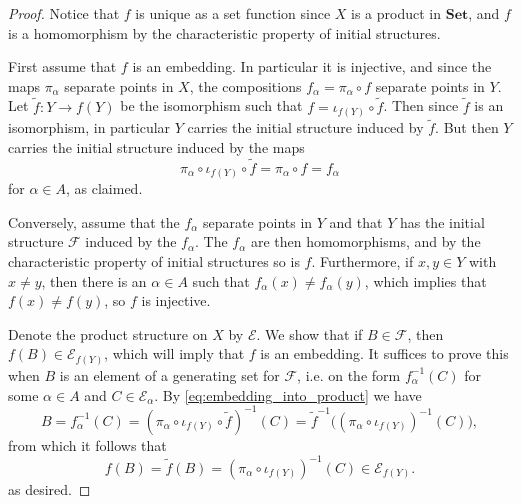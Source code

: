 \documentclass[article, a4paper, 11pt, oneside]{memoir}
\numberwithin{equation}{chapter}
\newcommand{\calE}{\mathcal{E}}
\newcommand{\calF}{\mathcal{F}}
\newcommand{\ncat}[1]{\mathbf{#1}} %
\newcommand{\catSet}{\ncat{Set}} %
\newcommand{\preim}{^{-1}}
\begin{document}
\begin{proof}
    Notice that $f$ is unique as a set function since $X$ is a product in $\catSet$, and $f$ is a homomorphism by the characteristic property of initial structures.

    First assume that $f$ is an embedding. In particular it is injective, and since the maps $\pi_\alpha$ separate points in $X$, the compositions $f_\alpha = \pi_\alpha \circ f$ separate points in $Y$. Let $\tilde f \colon Y \to f(Y)$ be the isomorphism such that $f = \iota_{f(Y)} \circ \tilde f$. Then since $\tilde f$ is an isomorphism, in particular $Y$ carries the initial structure induced by $\tilde f$. But then $Y$ carries the initial structure induced by the maps
    \begin{equation}
        \label{eq:embedding_into_product}
        \pi_\alpha \circ \iota_{f(Y)} \circ \tilde f
            = \pi_\alpha \circ f
            = f_\alpha
    \end{equation}
    for $\alpha \in A$, as claimed.

    Conversely, assume that the $f_\alpha$ separate points in $Y$ and that $Y$ has the initial structure $\calF$ induced by the $f_\alpha$. The $f_\alpha$ are then homomorphisms, and by the characteristic property of initial structures so is $f$. Furthermore, if $x,y \in Y$ with $x \neq y$, then there is an $\alpha \in A$ such that $f_\alpha(x) \neq f_\alpha(y)$, which implies that $f(x) \neq f(y)$, so $f$ is injective.

    Denote the product structure on $X$ by $\calE$. We show that if $B \in \calF$, then $f(B) \in \calE_{f(Y)}$, which will imply that $f$ is an embedding. It suffices to prove this when $B$ is an element of a generating set for $\calF$, i.e. on the form $f_\alpha\preim(C)$ for some $\alpha \in A$ and $C \in \calE_\alpha$. By \eqref{eq:embedding_into_product} we have
    \begin{equation*}
        B
            = f_\alpha\preim(C)
            = (\pi_\alpha \circ \iota_{f(Y)} \circ \tilde f)\preim(C)
            = \tilde f\preim \big( (\pi_\alpha \circ \iota_{f(Y)})\preim(C) \big),
    \end{equation*}
    from which it follows that
    \begin{equation*}
        f(B)
            = \tilde f(B)
            = (\pi_\alpha \circ \iota_{f(Y)})\preim(C)
            \in \calE_{f(Y)}.
    \end{equation*}
    as desired.
\end{proof}
\end{document}
